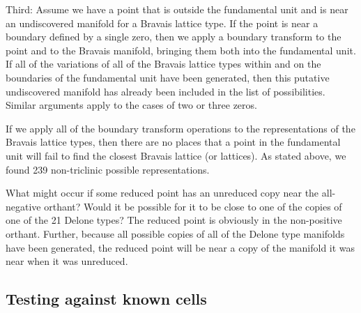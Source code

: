 \documentclass[preprint]{iucr}              %
\begin{document}
	Third: Assume we have a point that is outside the fundamental 
	unit and is near an undiscovered manifold for a Bravais lattice 
	type. If the point is near a boundary defined by a single 
	zero, then we apply a boundary transform to the point and to 
	the Bravais manifold, bringing them both into the fundamental 
	unit. If all of the variations of all of the Bravais 
	lattice types within and on the boundaries of the fundamental unit have 
	been generated, then this putative undiscovered manifold 
	has already been included in the list of possibilities. 
	Similar arguments apply to the cases of two or three zeros.
	
	If we apply all of the boundary transform operations to the 
	representations of the Bravais lattice types, then 
	there are no places that a point in the fundamental 
	unit will fail to find the closest Bravais lattice 
	(or lattices). As stated above, we found 239 
	non-triclinic possible representations.
	
	What might occur if some reduced point has an unreduced 
	copy near the all-negative orthant?  Would it be 
	possible for it to be close to one of the copies of one 
	of the 21 Delone types? The reduced point is obviously in 
	the non-positive orthant. Further, because all possible 
	copies of all of the Delone type manifolds have been 
	generated, the reduced point will be near a copy of the 
	manifold it was near when it was unreduced.
	
	\subsection{Testing against known cells}
	
\end{document}
